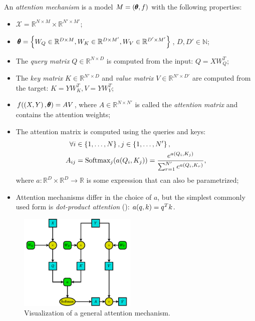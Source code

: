 \begin{definition}
An \emph{attention mechanism} is a model $M=\mathopen{}\left(\pmb{\theta}, f\right)$ with the following properties:
\begin{itemize}
\item $\mathcal{X}=\mathbb{R}^{N \times M} \times \mathbb{R}^{N' \times M'}$; 
\item $\pmb{\theta}=\mathopen{}\left\{W_Q \in \mathbb{R}^{D \times M}, W_K \in \mathbb{R}^{D \times M'}, W_V \in \mathbb{R}^{D' \times M'}\right\}$, $D, D' \in \mathbb{N}$;
\item The \emph{query matrix} $Q \in \mathbb{R}^{N \times D}$ is computed from the input: $Q = X W_Q^T$;
\item The \emph{key matrix} $K \in \mathbb{R}^{N' \times D}$ and \emph{value matrix} $V \in \mathbb{R}^{N' \times D'}$ are computed from the target: $K=Y W_K^T, V=Y W_V^T$;
\item $f\mathopen{}\left(\mathopen{}\left(X, Y\right), \pmb{\theta}\right) = A V$, where $A \in \mathbb{R}^{N \times N'}$ is called the \emph{attention matrix} and contains the attention weights;
\item The attention matrix is computed using the queries and keys: 
\begin{align}
\forall i &\in \mathopen{}\left\{1,\dots,N\right\}, j \in \mathopen{}\left\{1,\dots,N'\right\}, \nonumber \\
A_{ij}&=\text{Softmax}_j\mathopen{}\left(a\mathopen{}\left(Q_i,K_j\right)\right)=\frac{e^{a\mathopen{}\left(Q_i,K_j\right)}}{\sum_{r=1}^{N'}{e^{a\mathopen{}\left(Q_i,K_r\right)}}},
\end{align}
where $a: \mathbb{R}^D \times \mathbb{R}^D \to \mathbb{R}$ is some expression that can also be parametrized;
\item Attention mechanisms differ in the choice of $a$, but the simplest commonly used form is \emph{dot-product attention} (\cite{luong_effective_2015}): $a\mathopen{}\left(q, k\right)=q^T k$.
\end{itemize}
\end{definition}

\begin{figure}[H]
\centering
\includegraphics[width=0.5\textwidth]{figures/background/attention.pdf}
\caption[Visualization of a general attention mechanism.]{Visualization of a general attention mechanism.}
\label{fig:attention}
\end{figure}

